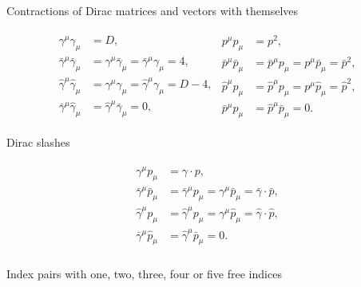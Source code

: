 \documentclass[../FeynCalcManual.tex]{subfiles}
\begin{document}
Contractions of Dirac matrices and vectors with themselves

\begin{align}
\begin{split}
\gamma^\mu \gamma_\mu  &=  D, \\
\bar{\gamma}^\mu \bar{\gamma}_\mu  &= \gamma^\mu \bar{\gamma}_\mu  = \bar{\gamma}^\mu \gamma_\mu = 4, \\
\hat{\gamma}^\mu \hat{\gamma}_\mu  &= \gamma^\mu \hat{\gamma}_\mu = \hat{\gamma}^\mu \gamma_\mu = D-4, \\
\bar{\gamma}^\mu \hat{\gamma}_\mu &=  \hat{\gamma}^\mu \bar{\gamma}_\mu = 0,
\end{split}
\begin{split}
p^\mu p_\mu &= p^2, \\
\bar{p}^\mu \bar{p}_\mu &= \bar{p}^\mu p_\mu = p^\mu \bar{p}_\mu =  \bar{p}^2, \\
\hat{p}^\mu \hat{p}_\mu &= \hat{p}^\mu p_\mu = p^\mu \hat{p}_\mu =  \hat{p}^2, \\
\bar{p}^\mu \hat{p}_\mu &= \hat{p}^\mu \bar{p}_\mu = 0.
\end{split}
\end{align}

Dirac slashes

\begin{align}
\begin{split}
\gamma^\mu p_\mu &= \gamma \cdot p, \\
\bar{\gamma}^\mu \bar{p}_\mu &= \bar{\gamma}^\mu p_\mu = \gamma^\mu \bar{p}_\mu = \bar{\gamma} \cdot \bar{p}, \\
\hat{\gamma}^\mu p_\mu &= \hat{\gamma}^\mu p_\mu = \gamma^\mu \hat{p}_\mu = \hat{\gamma} \cdot \hat{p}, \\
\bar{\gamma}^\mu \hat{p}_\mu &= \hat{\gamma}^\mu \bar{p}_\mu = 0. \\
\end{split}
\end{align}

Index pairs with one, two, three, four or five free indices
\end{document}
